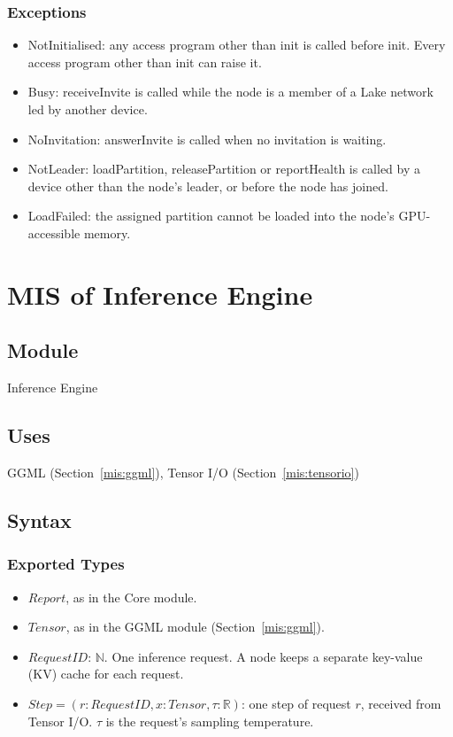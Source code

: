 \documentclass[12pt, titlepage]{article}
\begin{document}
\subsubsection{Exceptions}

\begin{itemize}
  \item NotInitialised: any access program other than init is called before
    init. Every access program other than init can raise it.
  \item Busy: receiveInvite is called while the node is a member of a Lake network led
    by another device.
  \item NoInvitation: answerInvite is called when no invitation is waiting.
  \item NotLeader: loadPartition, releasePartition or reportHealth is called by a device other than the
    node's leader, or before the node has joined.
  \item LoadFailed: the assigned partition cannot be loaded into the node's
    GPU-accessible memory.
\end{itemize}

\newpage

\section{MIS of Inference Engine} \label{mis:ie}

\subsection{Module}

Inference Engine

\subsection{Uses}

GGML (Section~\ref{mis:ggml}), Tensor I/O (Section~\ref{mis:tensorio})

\subsection{Syntax}

\subsubsection{Exported Types}

\begin{itemize}
  \item $\mathit{Report}$, as in the Core module.
  \item $\mathit{Tensor}$, as in the GGML module (Section~\ref{mis:ggml}).
  \item $\mathit{RequestID}$: $\mathbb{N}$. One inference request. A node keeps a
    separate key-value (KV) cache for each request.
  \item $\mathit{Step} = (r: \mathit{RequestID}, x: \mathit{Tensor}, \tau:
    \mathbb{R})$: one step of request $r$, received from Tensor I/O. $\tau$ is
    the request's sampling temperature.
\end{itemize}
\end{document}
